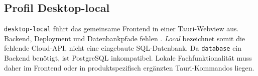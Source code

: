 \subsection{Profil Desktop-local}
\label{subsec:profil-desktop-local}

\texttt{desktop-local} führt das gemeinsame Frontend in einer Tauri-Webview
aus. Backend, Deployment und Datenbankpfade fehlen
\parencite{kleiveist2026profiles}. \emph{Local} bezeichnet somit die fehlende
Cloud-API, nicht eine eingebaute SQL-Datenbank. Da \texttt{database} ein
Backend benötigt, ist PostgreSQL inkompatibel.
Lokale Fachfunktionalität muss daher im Frontend oder in produktspezifisch
ergänzten Tauri-Kommandos liegen.
